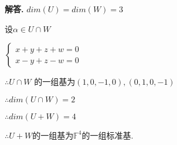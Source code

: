 \documentclass[12pt, a4paper, oneside]{ctexart}
\newcounter{problemname}
\newenvironment{solution}{\par\noindent\textbf{解答. }}{\par}
\newenvironment{note}{\par\noindent\textbf{题目\arabic{problemname}的注记. }}{\par}
\begin{document}
\begin{solution}
    $dim(U)=dim(W)=3$

    设$\alpha \in U \cap W$

    $
    \begin{cases}
        x+y+z+w=0\\
        x-y+z-w=0
    \end{cases}
    $

    $\therefore U\cap W$ 的一组基为$(1,0,-1,0),(0,1,0,-1)$

    $\therefore dim(U\cap W)=2$

    $\therefore dim(U+W)=4$

    $\therefore U+W$的一组基为$\mathbb{F}^4$的一组标准基.
\end{solution}
\end{document}
